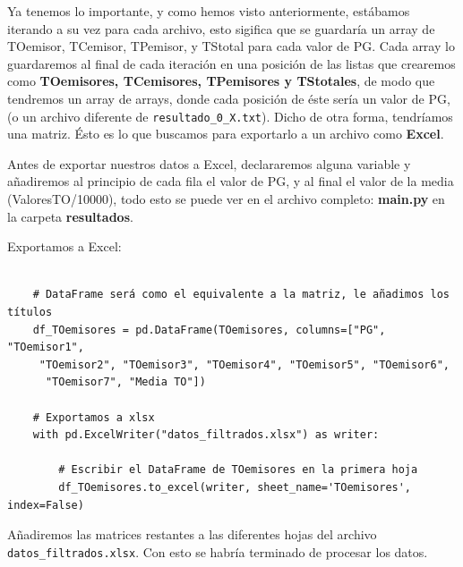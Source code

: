 \documentclass{article}
\begin{document}
Ya tenemos lo importante, y como hemos visto anteriormente, estábamos iterando a su vez para cada archivo, esto sigifica que se guardaría un array de TOemisor, TCemisor, TPemisor, y TStotal para cada valor de PG. Cada array lo guardaremos al final de cada iteración en una posición de las listas que crearemos como \textbf{TOemisores, TCemisores, TPemisores y TStotales}, de modo que tendremos un array de arrays, donde cada posición de éste sería un valor de PG, (o un archivo diferente de \verb|resultado_0_X.txt|). Dicho de otra forma, tendríamos una matriz. Ésto es lo que buscamos para exportarlo a un archivo como \textbf{Excel}.

\quad

Antes de exportar nuestros datos a Excel, declararemos alguna variable y añadiremos al principio de cada fila el valor de PG, y al final el valor de la media (ValoresTO/10000), todo esto se puede ver en el archivo completo: \textbf{main.py} en la carpeta \textbf{resultados}.

Exportamos a Excel:

\begin{center} 
    \begin{verbatim}

    # DataFrame será como el equivalente a la matriz, le añadimos los títulos 
    df_TOemisores = pd.DataFrame(TOemisores, columns=["PG", "TOemisor1",
     "TOemisor2", "TOemisor3", "TOemisor4", "TOemisor5", "TOemisor6",
      "TOemisor7", "Media TO"])

    # Exportamos a xlsx
    with pd.ExcelWriter("datos_filtrados.xlsx") as writer:

        # Escribir el DataFrame de TOemisores en la primera hoja
        df_TOemisores.to_excel(writer, sheet_name='TOemisores', index=False)

    \end{verbatim}
    \end{center} 
\quad

Añadiremos las matrices restantes a las diferentes hojas del archivo \verb|datos_filtrados.xlsx|. Con esto se habría terminado de procesar los datos.
\end{document}
